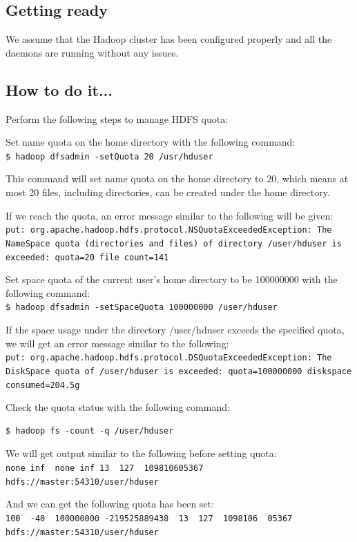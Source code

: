 \subsection*{Getting ready}
We assume that the Hadoop cluster has been configured properly and all the daemons are running without any issues.

\subsection*{How to do it...}
Perform the following steps to manage HDFS quota:

Set name quota on the home directory with the following command: \\
\verb|$ hadoop dfsadmin -setQuota 20 /usr/hduser|

This command will set name quota on the home directory to 20, which means at most 20 files, including directories, can be created under the home directory. 

If we reach the quota, an error message similar to the following will be given: \\
\verb|put: org.apache.hadoop.hdfs.protocol.NSQuotaExceededException: The NameSpace quota (directories and files) of directory /user/hduser is exceeded: quota=20 file count=141|

Set space quota of the current user's home directory to be 100000000 with the following command: \\
\verb|$ hadoop dfsadmin -setSpaceQuota 100000000 /user/hduser|

If the space usage under the directory /user/hduser exceeds the specified quota, we will get an error message similar to the following: \\
\verb|put: org.apache.hadoop.hdfs.protocol.DSQuotaExceededException: The DiskSpace quota of /user/hduser is exceeded: quota=100000000 diskspace consumed=204.5g| 

Check the quota status with the following command:
\begin{verbatim}
$ hadoop fs -count -q /user/hduser
\end{verbatim}

We will get output similar to the following before setting quota: \\
\verb|none inf  none inf 13  127  109810605367 hdfs://master:54310/user/hduser|

And we can get the following quota has been set: \\
\verb|100  -40  100000000 -219525889438  13  127  1098106  05367 hdfs://master:54310/user/hduser| 

